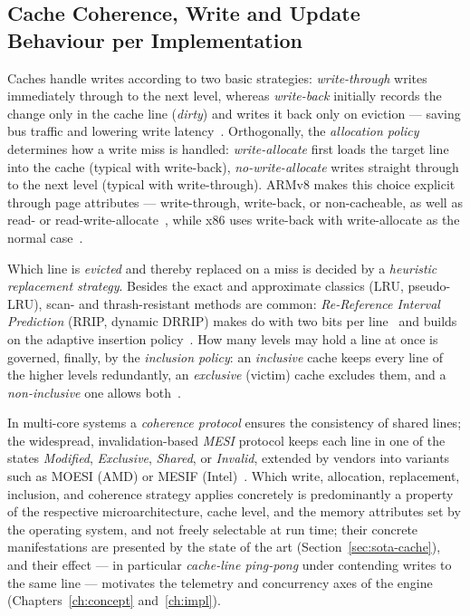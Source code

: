 \subsection{Cache Coherence, Write and Update Behaviour per Implementation}\label{ssec:coherence}
Caches handle writes according to two basic strategies: \emph{write-through} writes immediately
through to the next level, whereas \emph{write-back} initially records the change only in the cache
line (\emph{dirty}) and writes it back only on eviction --- saving bus traffic and lowering write
latency~\cite{hennessy2019architecture}. Orthogonally, the \emph{allocation policy} determines how a
write miss is handled: \emph{write-allocate} first loads the target line into the cache (typical
with write-back), \emph{no-write-allocate} writes straight through to the next level (typical with
write-through). ARMv8 makes this choice explicit through page attributes --- write-through,
write-back, or non-cacheable, as well as read- or read-write-allocate~\cite{arm_arm}, while x86 uses
write-back with write-allocate as the normal case~\cite{intel_sdm}.

Which line is \emph{evicted} and thereby replaced on a miss is decided by a
\emph{heuristic replacement strategy}. Besides the exact and approximate classics (LRU, pseudo-LRU),
scan- and thrash-resistant methods are common: \emph{Re-Reference Interval Prediction} (RRIP,
dynamic DRRIP) makes do with two bits per line~\cite{jaleel2010rrip} and builds on the adaptive
insertion policy~\cite{qureshi2007adaptive}. How many levels may hold a line at once is governed,
finally, by the \emph{inclusion policy}: an \emph{inclusive} cache keeps every line of the higher
levels redundantly, an \emph{exclusive} (victim) cache excludes them, and a \emph{non-inclusive} one
allows both~\cite{hennessy2019architecture}.

In multi-core systems a \emph{coherence protocol} ensures the consistency of shared lines; the
widespread, invalidation-based \emph{MESI} protocol keeps each line in one of the states
\emph{Modified}, \emph{Exclusive}, \emph{Shared}, or \emph{Invalid}, extended by vendors into
variants such as MOESI (AMD) or MESIF (Intel)~\cite{hennessy2019architecture}. Which write,
allocation, replacement, inclusion, and coherence strategy applies concretely is predominantly a
property of the respective microarchitecture, cache level, and the memory attributes set by the
operating system, and not freely selectable at run time; their concrete manifestations are presented
by the state of the art (Section~\ref{sec:sota-cache}), and their effect --- in particular
\emph{cache-line ping-pong} under contending writes to the same line --- motivates the telemetry and
concurrency axes of the engine (Chapters~\ref{ch:concept} and~\ref{ch:impl}).

